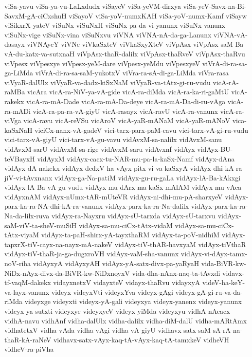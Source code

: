 {viSa-yavu
viSa-ya-vu-LaLxdudx
viSayeV
viSa-yeVM-dirxya
viSa-yeV-Savx-na-Bi-SavxM-gA-ciCxshuH
viSayoV
viSa-yoV-numxKAH
viSa-yoV-numx-Kamf
viSayw
viSikxrX-yateV
viSuNx
viSuNxH
viSuNx-pa-da-vi-yanunx
viSuNx-vanunx
viSuNx-vige
viSuNx-vina
viSuNxvu
viVNA
viVNA-nA-da-ga-Lanunx
viVNA-vA-dasayx
viVNAyeY
viVNe
viVkaSxteV
viVkaSxyXteV
viVpAsx
viVpAsx-saM-Ba-vA-du-katx-va-sutxnaH
viVpAsx-thaR-dalilx
viVpAsx-thaRveV
viVpAsx-thaRvu
viVpesx
viVpesxye
viVpesx-yeM-dare
viVpesx-yeMdu
viVpesxyeV
viVrA-di-ra-sa-ga-LiMda
viVrA-di-ra-sa-saM-yukotxV
viVra-ra-sA-di-ga-LiMda
viVra-rasa
viVyaR-dalUlx
viVyaR-va-dadx-kiSxNaM
viVyaR-va-tAtx-gi-ru-vudu
vicA-rA-raMBa
vicAra
vicA-ra-NiV-ya-vA-gide
vicA-ra-diMda
vicA-ra-ka-ri-gaMtU
vicA-rakekx
vicA-ra-mA-Dade
vicA-ra-mA-Da-deye
vicA-ra-mA-Da-di-ru-vAga
vicA-ra-mADi
vicA-ra-pa-ra-vA-giyU
vicA-rasayx
vicA-ravU
vicA-ra-vanunx
vicA-ra-viVga
vicA-ravu
vicA-reVSu
vicAroV
vicA-yaR-mANaM
vicA-yaR-mANoV
vica-kaSxNaH
viciCx-nanx-vA-gadeV
vici-tarx-parx-paM-cavu
vici-tarx-vA-gi-ru-vudu
vici-tarx-vA-giyU
vici-tarx-vA-gu-vavu
vidAvxM-sa-nalilx
vidAvxM-sanu
vidAvxM-sarU
vidAvxM-sa-rige
vidAvxM-saru
vidAvxnf
vidAyx
vidAyx-BU-teVBayxH
vidAyxM
vidAyx-cacx-tu-NAR-mu-pa-la-kaSx-Namf
vidAyx-dAna
vidAyx-dA-nakekx
vidAyx-dedxV-ha-vAyx-pitx-vi-va-kaSxyA
vidAyx-dhi-kA-ra-jiV-vi-tAvxnanx
vidAyx-ga-Na-patiM
vidAyx-gu-ru-gaLa
vidAyx-lA-Ba-kAkxgi
vidAyx-lA-Ba-vA-gu-vudu
vidAyx-mu-dArx-ma-kaSx-mAlAM
vidAyx-mu-vAca
vidAyxnAM
vidAyx-nUmx-tAR-mUteVR
vidAyx-ni-dhi-mu-pA-sharxyeV
vidAyx-parx-ka-ra-NA-dhi-kA-ra-vanunx
vidAyx-parx-ka-ra-Na-dalilx
vidAyx-parx-ka-ra-Na-da-lilx-ruva
vidAyx-ra-Nayxru
vidAyx-sU-tarxda
vidAyx-sU-tarxvu
vidAyx-saM-viV-ta-sheV-muSiH
vidAyx-sa-mu-ciCx-tAtx-vidaM
vidAyx-sa-mu-ciCx-tAtx-viyaM
vidAyx-ta-paH-shirx-yA-tayxthaRM
vidAyx-ta-poV-nidhiM
vidAyx-tapxrX-tiV-cayx-na-nayx-mA-nakeV
vidAyx-tiV-thAR-havxyaM
vidAyx-tiVthaR
vidAyx-tiV-thaR-ja-ga-dugxroVH
vidAyx-vaM-sha-vanunx
vidAyx-vi-dAyx-tamx-noV-riha
vidAyxyA
vidAyxyAH
vidAyx-yA-satx-divx-pa-yaRyaH
vida-BiVR-kw-NiDx-nAyx-divx-da-BiVR-kw-NiDxnoyxV
vida-dha-nAnx-naq-ta-tAvxdi
vidavx-tf-vaqM-dakekx
vidayxnetxV
vidayxteV
vidayx-thaRvu
vidayxyA
videV-ha-keY-va-layx-vanunx
videyx
videyxVti
videyxYva
videyx-gAgi
videyx-gA-gi-ru-va-da-riMda
videyxge
videyxti
videyx-yA-gali
videyxya
videyx-yanenx
videyx-yanunx
videyx-ya-sutxti
videyxye
videyxyeV
videyx-yiMda
videyxyu
vidhA-nAcacx
vidhA-navu
vidhAnf
vidha-dalUlx
vidha-dalilx
vidha-diM-dalU
vidha-mARtAmx
vidhatetxV
vidha-vAda
vidha-vAgi
vidha-vA-giyU
vidhavx-satx-saM-sA-rA-na-thaR-kA-raNeV
vidhavx-satx-vAyx-kaq-tA-vAyx-kaq-tA-tamxkeV
vidheVH
vidheV-ra-piVha
}
